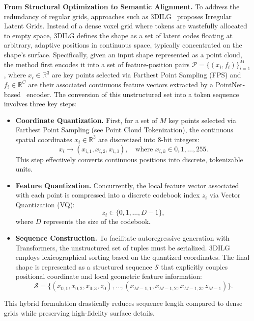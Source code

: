 \documentclass[../../book-main.tex]{subfiles}
\begin{document}
\textbf{From Structural Optimization to Semantic Alignment.}
To address the redundancy of regular grids, approaches such as
3DILG~\cite{zhang20223dilg} proposes Irregular Latent Grids.
Instead of a dense voxel grid where tokens are wastefully
allocated to empty space, 3DILG defines the shape as a set
of latent codes floating at arbitrary, adaptive positions
in continuous space, typically concentrated on the shape's surface.
Specifically, given an input shape represented as a point cloud, the
method first encodes it into a set of feature-position pairs
$\mathcal{P} = \{(x_i, f_i)\}_{i=1}^M$, where $x_i \in \mathbb{R}^3$
are key points selected via Farthest Point Sampling (FPS) and $f_i
\in \mathbb{R}^C$ are their associated continuous feature vectors
extracted by a PointNet-based~\cite{qi2017pointnet} encoder. The
conversion of this unstructured set into a token sequence involves
three key steps:
\begin{itemize}
\item \textbf{Coordinate Quantization.} First, for a set of $M$ key
    points selected via Farthest Point Sampling (see Point Cloud
    Tokenization), the continuous spatial coordinates $x_i \in
    \mathbb{R}^3$ are discretized into 8-bit integers:
    \begin{equation}
        x_i \rightarrow (x_{i,1}, x_{i,2}, x_{i,3}), \quad
        \text{where } x_{i,k} \in {0, 1, \dots, 255}.
    \end{equation}
    This step effectively converts continuous positions into
    discrete, tokenizable units.

\item \textbf{Feature Quantization.} Concurrently, the local feature
    vector associated with each point is compressed into a discrete
    codebook index $z_i$ via Vector Quantization (VQ):
    \begin{equation}
        z_i \in \{0, 1, \dots, D-1\},
    \end{equation}
    where $D$ represents the size of the codebook.

\item \textbf{Sequence Construction.} To facilitate autoregressive
    generation with Transformers, the unstructured set of tuples must
    be serialized. 3DILG employs lexicographical sorting based on the
    quantized coordinates. The final shape is represented as a
    structured sequence $\mathcal{S}$ that explicitly couples
    positional coordinate and local geometric feature information:
    \begin{equation}
        \mathcal{S} = \big\{ (x_{0,1}, x_{0,2}, x_{0,3}, z_0), \dots,
        (x_{M-1,1}, x_{M-1,2}, x_{M-1,3}, z_{M-1}) \big\}.
    \end{equation}
\end{itemize}
This hybrid formulation drastically reduces sequence length compared
to dense grids while preserving high-fidelity surface details.
\end{document}
